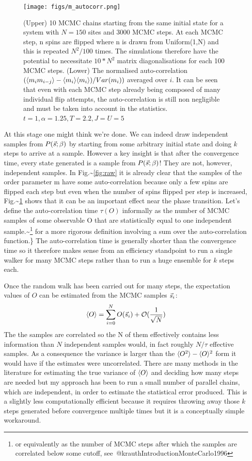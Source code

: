 \begin{figure}
  \centering
  \texttt{[image: figs/m\_autocorr.png]}
  \caption{(Upper) 10 MCMC chains starting from the same initial state for a system with $N = 150$ sites and 3000 MCMC steps. At each MCMC step, n spins are flipped where n is drawn from Uniform(1,N) and this is repeated $N^2/100$ times. The simulations therefore have the potential to necessitate $10*N^2$ matrix diagonalisations for each 100 MCMC steps. (Lower) The normalised auto-correlation $(\langle m_i m_{i-j} \rangle - \langle m_i \rangle\langle m_i \rangle) / Var(m_i))$ averaged over $i$. It can be seen that even with each MCMC step already being composed of many individual flip attempts, the auto-correlation is still non negligible and must be taken into account in the statistics. $t = 1, \alpha = 1.25, T = 2.2, J = U = 5 $ \label{fig:m_autocorr}}
\end{figure}

At this stage one might think we're done. We can indeed draw independent samples from \(P(\vec{s}; \beta)\) by starting from some arbitrary initial state and doing \(k\) steps to arrive at a sample. However a key insight is that after the convergence time, every state generated is a sample from \(P(\vec{s}; \beta)\)! They are not, however, independent samples. In Fig.\textasciitilde{}\ref{fig:raw} it is already clear that the samples of the order parameter m have some auto-correlation because only a few spins are flipped each step but even when the number of spins flipped per step is increased, Fig.\textasciitilde{}\ref{fig:m_autocorr} shows that it can be an important effect near the phase transition. Let's define the auto-correlation time \(\tau(O)\) informally as the number of MCMC samples of some observable O that are statistically equal to one independent sample.\textasciitilde{}\footnote{or equivalently as the number of MCMC steps after which the samples are correlated below some cutoff, see~@krauthIntroductionMonteCarlo1996} for a more rigorous definition involving a sum over the auto-correlation function.\} The auto-correlation time is generally shorter than the convergence time so it therefore makes sense from an efficiency standpoint to run a single walker for many MCMC steps rather than to run a huge ensemble for \(k\) steps each.

Once the random walk has been carried out for many steps, the expectation values of \(O\) can be estimated from the MCMC samples \(\vec{s}_i\): \[
    \langle O \rangle = \sum_{i = 0}^{N} O(\vec{s}_i) + \mathcal{O}(\frac{1}{\sqrt{N}})
\] The the samples are correlated so the N of them effectively contains less information than \(N\) independent samples would, in fact roughly \(N/\tau\) effective samples. As a consequence the variance is larger than the \(\langle O^2 \rangle - \langle O \rangle^2\) form it would have if the estimates were uncorrelated. There are many methods in the literature for estimating the true variance of \(\langle O \rangle\) and deciding how many steps are needed but my approach has been to run a small number of parallel chains, which are independent, in order to estimate the statistical error produced. This is a slightly less computationally efficient because it requires throwing away those \(k\) steps generated before convergence multiple times but it is a conceptually simple workaround.


